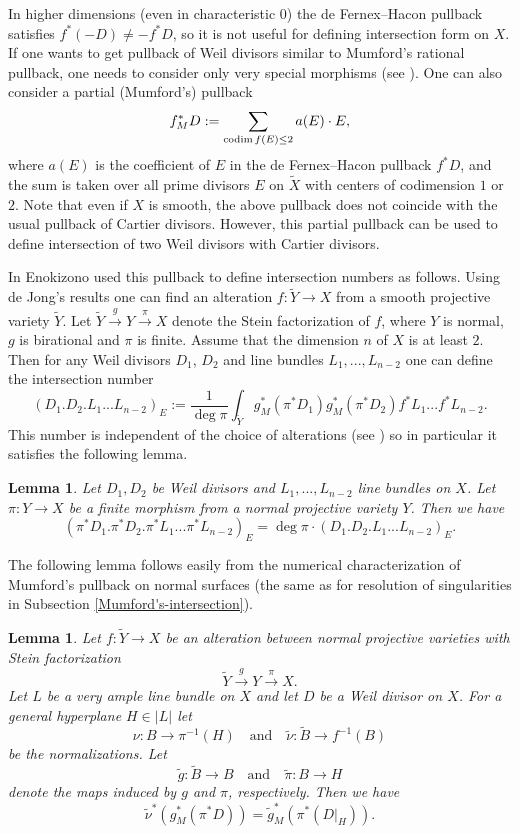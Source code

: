 \documentclass[twoside, 11pt]{article}
\theoremstyle{plain}
\newtheorem{Lemma}[Thm]{\sc Lemma}
\theoremstyle{definition}
\theoremstyle{remark}
\begin{document}
In higher dimensions (even in characteristic $0$)  the de Fernex--Hacon pullback  satisfies $f^*(-D)\ne -f^*D$, so it is  not useful for defining intersection form on $X$. If one wants to get pullback of Weil divisors similar to Mumford's rational pullback, one needs to consider only very special morphisms (see \cite{Sc}). 
One can also consider a partial (Mumford's) pullback 
$$f^*_MD:=\sum _{{\rm codim}\, f(E)\le 2}a(E)\cdot E,$$
where $a(E)$ is the coefficient of $E$ in the de Fernex--Hacon pullback   $f^*D$, and the sum is taken over all
prime divisors $E$ on $\tilde X$ with centers of codimension $1$ or $2$.  Note that even if $X$ is smooth, the above pullback does not coincide with the usual pullback of Cartier divisors. However, this partial pullback can be used to define intersection of two Weil divisors with Cartier divisors.


In  \cite[Appendix]{En}  Enokizono used this pullback to define intersection numbers as follows.
Using de Jong's results \cite{dJ} one can find an alteration $f: \tilde Y\to X$ from a smooth projective variety $\tilde Y$. Let $\tilde Y\stackrel{g}{\longrightarrow}Y\stackrel{\pi}{\longrightarrow}X$ denote the Stein factorization of $f$, where $Y$ is normal, $g$ is birational and $\pi$ is finite. Assume that the dimension $n$ of $X$ is at least $2$.
Then for any Weil divisors $D_1$, $D_2$ and line bundles $L_1,..., L_{n-2}$
one can define the intersection number
$$(D_1.D_2.L_1...L_{n-2})_E:= \frac{1}{\deg \pi} \int_{\tilde Y}g_M^*(\pi^*D_1)g_M^*(\pi^*D_2)f^*L_1...f^*L_{n-2}.$$ 
This number is independent of the choice of alterations (see \cite[Lemma A.5]{En}) so in particular it satisfies the following lemma.

\begin{Lemma}\label{c_2-direct-sum-any-dim-Enokizono} 
	Let $D_1, D_2$ be Weil divisors and $L_1,..., L_{n-2}$ line bundles on $X$. 
	Let  $ \pi: Y\to X$ be a finite morphism from a normal  projective variety $Y$. Then we have
	$$(\pi^*D_1.\pi^*D_2. \pi^*L_1...\pi^*L_{n-2})_E= \deg \pi \cdot (D_1.D_2.L_1...L_{n-2})_E.$$
\end{Lemma}
 

The following lemma follows easily from the numerical characterization of  Mumford's pullback on normal surfaces (the same as for resolution of singularities in Subsection \ref{Mumford's-intersection}).

\begin{Lemma}
Let  $f: \tilde Y\to X$ be an alteration between normal projective varieties with Stein factorization 
\[
\tilde{Y} \xrightarrow{g} Y \xrightarrow{\pi} X.
\]
Let $L$ be a very ample line bundle on $X$ and let $D$ be a Weil divisor on $X$. For a general hyperplane $H\in |L|$ let 
\[
\nu: B \to \pi^{-1}(H) \quad \text{and} \quad \tilde{\nu}: \tilde{B} \to f^{-1}(B)
\]
be the normalizations. Let
\[
\tilde{g}: \tilde{B} \to B \quad \text{and} \quad \tilde{\pi}: B \to H
\]
denote the maps induced by \( g \) and \( \pi \), respectively. Then  we have 
\[\tilde \nu^* (g_M^*(\pi^*D))= \tilde g_M^*(\pi^*(D|_H)).
\]
\end{Lemma}
\end{document}

